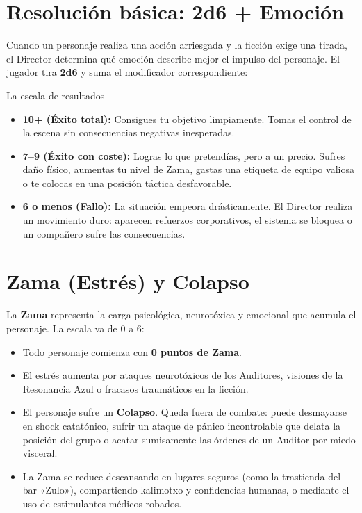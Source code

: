 \section{Resolución básica: 2d6 + Emoción}

Cuando un personaje realiza una acción arriesgada y la ficción exige una tirada, el Director determina qué emoción describe mejor el impulso del personaje. El jugador tira \textbf{2d6} y suma el modificador correspondiente:

\begin{CajaRegla}{La escala de resultados}
\begin{itemize}
  \item \textbf{10+ (Éxito total):} Consigues tu objetivo limpiamente. Tomas el control de la escena sin consecuencias negativas inesperadas.
  \item \textbf{7--9 (Éxito con coste):} Logras lo que pretendías, pero a un precio. Sufres daño físico, aumentas tu nivel de Zama, gastas una etiqueta de equipo valiosa o te colocas en una posición táctica desfavorable.
  \item \textbf{6 o menos (Fallo):} La situación empeora drásticamente. El Director realiza un movimiento duro: aparecen refuerzos corporativos, el sistema se bloquea o un compañero sufre las consecuencias.
\end{itemize}
\end{CajaRegla}

\section{Zama (Estrés) y Colapso}

La \textbf{Zama} representa la carga psicológica, neurotóxica y emocional que acumula el personaje. La escala va de 0 a 6:
\begin{itemize}
  \item Todo personaje comienza con \textbf{0 puntos de Zama}.
  \item El estrés aumenta por ataques neurotóxicos de los Auditores, visiones de la Resonancia Azul o fracasos traumáticos en la ficción.
  \item {} El personaje sufre un \textbf{Colapso}. Queda fuera de combate: puede desmayarse en shock catatónico, sufrir un ataque de pánico incontrolable que delata la posición del grupo o acatar sumisamente las órdenes de un Auditor por miedo visceral.
  \item {} La Zama se reduce descansando en lugares seguros (como la trastienda del bar «Zulo»), compartiendo kalimotxo y confidencias humanas, o mediante el uso de estimulantes médicos robados.
\end{itemize}

